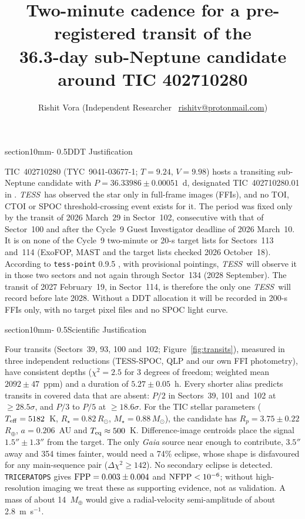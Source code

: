 \documentclass[letterpaper,11pt]{article}
\title{Two-minute cadence for a pre-registered transit of the\\ 36.3-day sub-Neptune candidate around TIC 402710280}
\author{Rishit Vora (Independent Researcher \textbar\ \href{mailto:rishitv@protonmail.com}{rishitv@protonmail.com})}
\date{}
\makeatletter
\renewcommand{\section}{\@startsection%
{section}{1}{0mm}{-\baselineskip}%
{0.5\baselineskip}{\normalfont\Large\bfseries}}%
\newcommand{\tess}{{\it TESS}}
\newcommand{\rsun}{$R_{\odot}$}
\newcommand{\msun}{$M_{\odot}$}
\newcommand{\re}{$R_{\oplus}$}
\newcommand{\ms}{m~s$^{-1}$}
\makeatother
\begin{document}
\pagestyle{plain}
\maketitle

\section{DDT Justification}

TIC~402710280 (TYC~9041-03677-1; $T = 9.24$, $V = 9.98$) hosts a transiting sub-Neptune candidate with $P = 36.33986 \pm 0.00051$~d, designated TIC~402710280.01 in \citet{Vora2026}. \tess\ has observed the star only in full-frame images (FFIs), and no TOI, CTOI or SPOC threshold-crossing event exists for it. The period was fixed only by the transit of 2026 March~29 in Sector~102, consecutive with that of Sector~100 and after the Cycle~9 Guest Investigator deadline of 2026 March~10. It is on none of the Cycle~9 two-minute or 20-s target lists for Sectors~113 and~114 (ExoFOP, MAST and the target lists checked 2026 October~18). According to \texttt{tess-point} 0.9.5 \citep{Burke2020}, with provisional pointings, \tess\ will observe it in those two sectors and not again through Sector~134 (2028 September). The transit of 2027 February~19, in Sector~114, is therefore the only one \tess\ will record before late 2028. Without a DDT allocation it will be recorded in 200-s FFIs only, with no target pixel files and no SPOC light curve.

\section{Scientific Justification}

Four transits (Sectors~39, 93, 100 and~102; Figure~\ref{fig:transits}), measured in three independent reductions (TESS-SPOC, QLP and our own FFI photometry), have consistent depths ($\chi^2 = 2.5$ for 3 degrees of freedom; weighted mean $2092 \pm 47$~ppm) and a duration of $5.27 \pm 0.05$~h. Every shorter alias predicts transits in covered data that are absent: $P/2$ in Sectors~39, 101 and~102 at $\geq 28.5\sigma$, and $P/3$ to $P/5$ at $\geq 18.6\sigma$. For the TIC stellar parameters ($T_{\rm eff} = 5182$~K, $R_\star = 0.82$\,\rsun, $M_\star = 0.88$\,\msun), the candidate has $R_p = 3.75 \pm 0.22$\,\re, $a = 0.206$~AU and $T_{\rm eq} \approx 500$~K. Difference-image centroids place the signal $1.5'' \pm 1.3''$ from the target. The only \textit{Gaia} source near enough to contribute, $3.5''$ away and 354 times fainter, would need a 74\% eclipse, whose shape is disfavoured for any main-sequence pair ($\Delta\chi^2 \geq 142$). No secondary eclipse is detected. \texttt{TRICERATOPS} \citep{Giacalone2021} gives ${\rm FPP} = 0.003 \pm 0.004$ and ${\rm NFPP} < 10^{-6}$; without high-resolution imaging we treat these as supporting evidence, not as validation. A mass of about 14~$M_\oplus$ would give a radial-velocity semi-amplitude of about 2.8~\ms.
\end{document}
